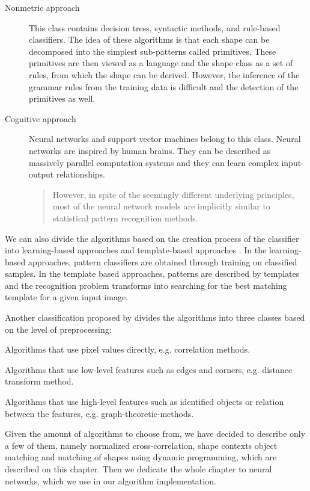 \begin{description}
\begin{description}
\item [Nonmetric approach] This class contains decision tress, syntactic methods, and rule-based classifiers. The idea of these algorithms is that each shape can be decomposed into the simplest sub-patterns called primitives. These primitives are then viewed as a language and the shape class as a set of rules, from which the shape can be derived. However, the inference of the grammar rules from the training data is difficult and the detection of the primitives as well.

\item [Cognitive approach] Neural networks and support vector machines belong to this class. Neural networks are inspired by human brains. They can be described as massively parallel computation systems and they can learn complex input-output relationships. \begin{quotation} However, in spite of the seemingly different underlying principles, most of the neural network models are implicitly similar to statistical pattern recognition methods. \end{quotation} \cite{imageRecognition}

\end{description}

We can also divide the algorithms based on the creation process of the classifier into learning-based approaches and template-based approaches \cite{skeletonMatching}. In the learning-based approaches, pattern classifiers are obtained through training on classified samples. In the template based approaches, patterns are described by templates and the recognition problem transforms into searching for the best matching template for a given input image.

Another classification proposed by \citet{distanceTransform} divides the algorithms into three classes based on the level of preprocessing:
\begin{description}
\item Algorithms that use pixel values directly, e.g. correlation methods.
\item Algorithms that use low-level features such as edges and corners, e.g. distance transform method.
\item Algorithms that use high-level features such as identified objects or relation between the features, e.g. graph-theoretic-methods.
\end{description}

Given the amount of algorithms to choose from, we have decided to describe only a few of them, namely normalized cross-correlation, shape contexts object matching and matching of shapes using dynamic programming, which are described on this chapter. Then we dedicate the whole chapter to neural networks, which we use in our algorithm implementation.


\end{description}
